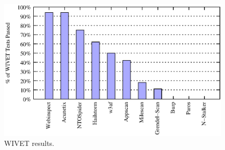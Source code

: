 \begin{figure}[tb]
  \centering
  \includegraphics{wivet_graph}
  \caption{WIVET results.}
\end{figure}
